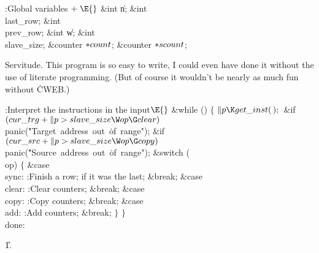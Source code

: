 \B{}:Global variables\X${}\mathrel+\E{}$\6
\&{int} \|n;\6
\&{int} \\{last\_row};\6
\&{int} \\{prev\_row};\6
\&{int} \|w;\6
\&{int} \\{slave\_size};\6
\&{counter} ${}{*}\\{count}{}$;\6
\&{counter} ${}{*}\\{scount}{}$;\par
\fi

Servitude. This program is so easy to write, I could even have
done it without the use of literate programming. (But of course
it wouldn't be nearly as much fun without \.{CWEB}.)

\Y\B\4:Interpret the instructions in the input\X${}\E{}$\6
\&{while} ()\5
${}\{{}$\1\6
${}\|p\K\\{get\_inst}(\,);{}$\6
\&{if} ${}(\\{cur\_trg}+\|p>\\{slave\_size}\W\\{op}\G\\{clear}){}$\1\5
\\{panic}(\.{"Target\ address\ out\ }\)\.{of\ range"});\2\6
\&{if} ${}(\\{cur\_src}+\|p>\\{slave\_size}\W\\{op}\G\\{copy}){}$\1\5
\\{panic}(\.{"Source\ address\ out\ }\)\.{of\ range"});\2\6
\&{switch} (\\{op})\5
${}\{{}$\1\6
\4\&{case} \\{sync}:\5
:Finish a row;  if it was the last\X;\5
\&{break};\6
\4\&{case} \\{clear}:\5
:Clear  counters\X;\5
\&{break};\6
\4\&{case} \\{copy}:\5
:Copy  counters\X;\5
\&{break};\6
\4\&{case} \\{add}:\5
:Add  counters\X;\5
\&{break};\6
\4${}\}{}$\2\6
\4${}\}{}$\2\6
\4\\{done}:\par
\U1.\fi

